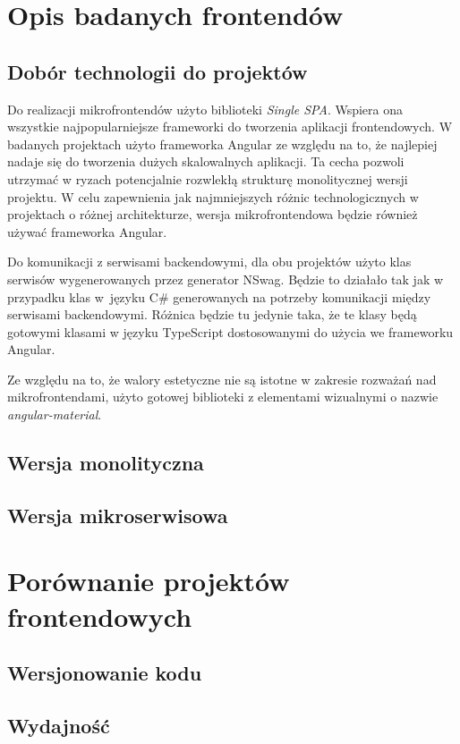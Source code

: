 \documentclass{SGGW-thesis}
\begin{document}
\chapter{Opis badanych frontendów}
  \section{Dobór technologii do projektów}
  Do realizacji mikrofrontendów użyto biblioteki \textit{Single SPA}. Wspiera ona wszystkie najpopularniejsze frameworki do tworzenia aplikacji frontendowych. W badanych projektach użyto frameworka Angular ze względu na to, że najlepiej nadaje się do tworzenia dużych skalowalnych aplikacji. Ta cecha pozwoli utrzymać w ryzach potencjalnie rozwlekłą strukturę monolitycznej wersji projektu. W celu zapewnienia jak najmniejszych różnic technologicznych w projektach o różnej architekturze, wersja mikrofrontendowa będzie również używać frameworka Angular.

  Do komunikacji z serwisami backendowymi, dla obu projektów użyto klas serwisów wygenerowanych przez generator NSwag. Będzie to działało tak jak w przypadku klas w~języku C\# generowanych na potrzeby komunikacji między serwisami backendowymi. Różnica będzie tu jedynie taka, że te klasy będą gotowymi klasami w języku TypeScript dostosowanymi do użycia we frameworku Angular.

  Ze względu na to, że walory estetyczne nie są istotne w zakresie rozważań nad mikrofrontendami, użyto gotowej biblioteki z elementami wizualnymi o nazwie \textit{angular-material}. 

  \section{Wersja monolityczna}
  \section{Wersja mikroserwisowa}

\chapter{Porównanie projektów frontendowych}
  \section{Wersjonowanie kodu}
  \section{Wydajność}
\end{document}
